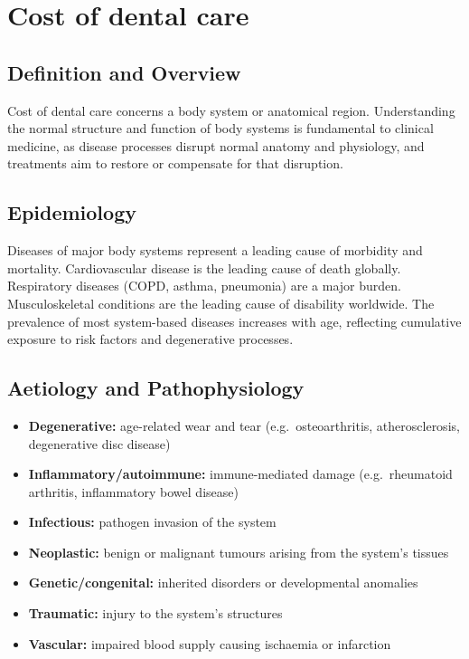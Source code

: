 \chapter{Cost of dental care}

\section*{Definition and Overview}
Cost of dental care concerns a body system or anatomical region. Understanding the normal structure and function of body systems is fundamental to clinical medicine, as disease processes disrupt normal anatomy and physiology, and treatments aim to restore or compensate for that disruption.

\section*{Epidemiology}
Diseases of major body systems represent a leading cause of morbidity and mortality. Cardiovascular disease is the leading cause of death globally. Respiratory diseases (COPD, asthma, pneumonia) are a major burden. Musculoskeletal conditions are the leading cause of disability worldwide. The prevalence of most system-based diseases increases with age, reflecting cumulative exposure to risk factors and degenerative processes.

\section*{Aetiology and Pathophysiology}
\begin{itemize}
    \item \textbf{Degenerative:} age-related wear and tear (e.g.\ osteoarthritis, atherosclerosis, degenerative disc disease)
    \item \textbf{Inflammatory/autoimmune:} immune-mediated damage (e.g.\ rheumatoid arthritis, inflammatory bowel disease)
    \item \textbf{Infectious:} pathogen invasion of the system
    \item \textbf{Neoplastic:} benign or malignant tumours arising from the system's tissues
    \item \textbf{Genetic/congenital:} inherited disorders or developmental anomalies
    \item \textbf{Traumatic:} injury to the system's structures
    \item \textbf{Vascular:} impaired blood supply causing ischaemia or infarction
\end{itemize}

